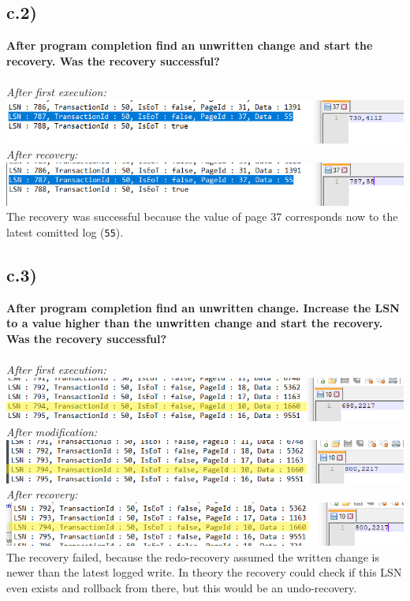 \documentclass[a4paper,english,abstract=on]{scrartcl}
\begin{document}
\subsection*{c.2)}
	\item \textbf{After program completion find an unwritten change and start the recovery. Was the recovery successful?}
\\~\\
\textit{After first execution:}\\
\includegraphics[width=\textwidth,height=\textheight,keepaspectratio]{c2_1.png}\\
\textit{After recovery:}\\
\includegraphics[width=\textwidth,height=\textheight,keepaspectratio]{c2_2.png}\\

The recovery was successful because the value of page 37 corresponds now to the latest comitted log (\texttt{55}).

\subsection*{c.3)}
\item \textbf{After program completion find an unwritten change. Increase the LSN to a value higher than the unwritten change and start the recovery. Was the recovery successful?}
\\~\\
\textit{After first execution:}\\
\includegraphics[width=\textwidth,height=\textheight,keepaspectratio]{c3_1.png}\\
\textit{After modification:}\\
\includegraphics[width=\textwidth,height=\textheight,keepaspectratio]{c3_2.png}\\
\textit{After recovery:}\\
\includegraphics[width=\textwidth,height=\textheight,keepaspectratio]{c3_3.png}\\

The recovery failed, because the redo-recovery assumed the written change is newer than the latest logged write. In theory the recovery could check if this LSN even exists and rollback from there, but this would be an undo-recovery.
\end{document}
